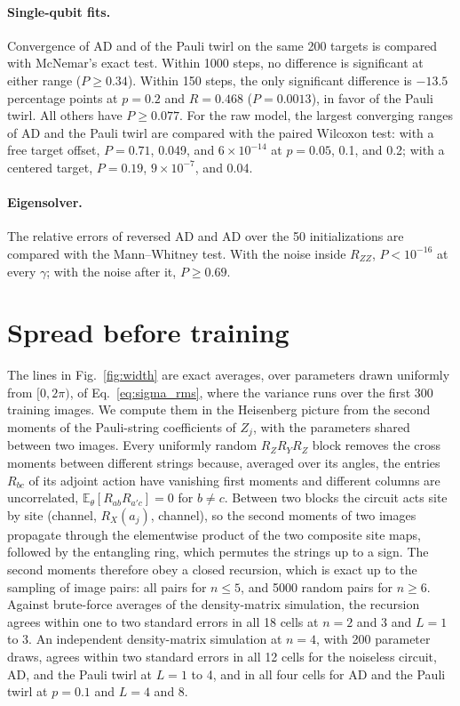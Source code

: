\documentclass[
 aps,pra,
 twocolumn,
 superscriptaddress,
 longbibliography,
 nofootinbib
]{revtex4-2}
\begin{document}
\paragraph{Single-qubit fits.}
Convergence of AD and of the Pauli twirl on the same 200 targets is compared
with McNemar's exact test. Within 1000 steps, no difference is significant at
either range ($P\ge0.34$). Within 150 steps, the only significant difference is
$-13.5$ percentage points at $p=0.2$ and $R=0.468$ ($P=0.0013$), in favor of
the Pauli twirl. All others have $P\ge0.077$. For the raw model, the largest converging ranges of AD and
the Pauli twirl are compared with the paired Wilcoxon test: with a free target
offset, $P=0.71$, 0.049, and $6\times10^{-14}$ at $p=0.05$, 0.1, and 0.2; with a
centered target, $P=0.19$, $9\times10^{-7}$, and 0.04.

\paragraph{Eigensolver.}
The relative errors of reversed AD and AD over the 50 initializations are
compared with the Mann--Whitney test. With the noise inside $R_{ZZ}$,
$P<10^{-16}$ at every $\gamma$; with the noise after it, $P\ge0.69$.

\section{Spread before training}
\label{app:width}

The lines in Fig.~\ref{fig:width} are exact averages, over parameters drawn
uniformly from $[0,2\pi)$, of Eq.~\eqref{eq:sigma_rms}, where the variance
runs over the first 300 training images. We compute them in
the Heisenberg picture from the second moments of the Pauli-string
coefficients of $Z_j$, with the parameters shared between two images. Every
uniformly random $R_ZR_YR_Z$ block removes the cross moments between different
strings because, averaged over its angles, the entries $R_{bc}$ of its
adjoint action have vanishing first moments and different columns are
uncorrelated, $\mathbb E_\theta[R_{ab}R_{a'c}]=0$ for $b\neq c$. Between two
blocks the circuit acts site by site (channel, $R_X(a_j)$, channel), so the
second moments of two images propagate through the elementwise product of the
two composite site maps, followed by the entangling ring, which permutes the
strings up to a sign. The second moments therefore obey a closed recursion, which is exact up
to the sampling of image pairs: all pairs for $n\le5$, and 5000 random pairs
for $n\ge6$. Against brute-force averages of the density-matrix simulation,
the recursion agrees within one to two standard errors in all 18 cells at
$n=2$ and 3 and $L=1$ to 3. An independent density-matrix simulation at $n=4$, with 200 parameter draws, agrees within two standard errors in all 12 cells for the noiseless circuit, AD, and the Pauli twirl at $L=1$ to 4, and in all four cells for AD and the Pauli twirl at $p=0.1$ and $L=4$ and 8.
\end{document}
